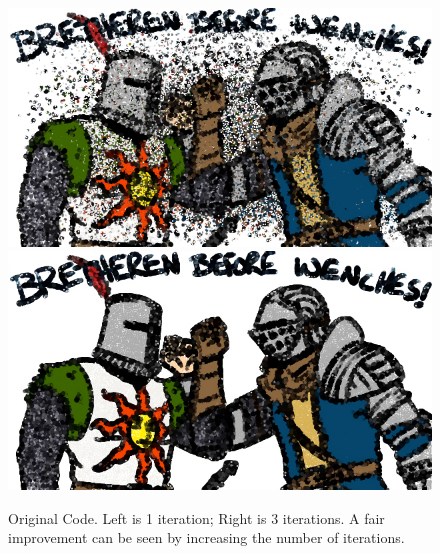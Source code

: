 \documentclass[11pt]{article}
\begin{document}
\begin{figure}[H]
\includegraphics[scale=0.5]{sunbros-plain-itr1-100000.png}
\includegraphics[scale=0.5]{sunbros-plain-itr3-100000.png}
\caption{Original Code. Left is 1 iteration; Right is 3 iterations. A fair improvement can be seen by increasing the number of iterations.}
\end{figure}
\end{document}

